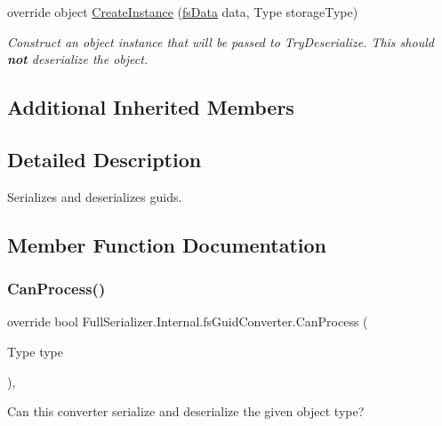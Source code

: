 \begin{DoxyCompactItemize}
override object \hyperlink{class_full_serializer_1_1_internal_1_1fs_guid_converter_a86f7beefe9d841a8f3235a805ec43691}{Create\+Instance} (\hyperlink{class_full_serializer_1_1fs_data}{fs\+Data} data, Type storage\+Type)
\begin{DoxyCompactList}\small\item\em Construct an object instance that will be passed to Try\+Deserialize. This should {\bfseries not} deserialize the object. \end{DoxyCompactList}\end{DoxyCompactItemize}
\subsection*{Additional Inherited Members}


\subsection{Detailed Description}
Serializes and deserializes guids. 



\subsection{Member Function Documentation}
\mbox{\label{class_full_serializer_1_1_internal_1_1fs_guid_converter_af5e30658913957e51c7caa51622c2627}} 
\subsubsection{\texorpdfstring{Can\+Process()}{CanProcess()}}
{\footnotesize\ttfamily override bool Full\+Serializer.\+Internal.\+fs\+Guid\+Converter.\+Can\+Process (\begin{DoxyParamCaption}\item[{Type}]{type }\end{DoxyParamCaption})\hspace{0.3cm}{\ttfamily [inline]}, {\ttfamily [virtual]}}



Can this converter serialize and deserialize the given object type? 


